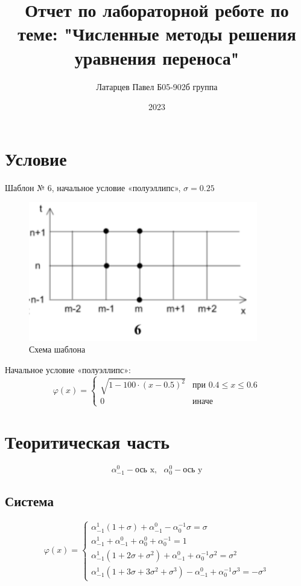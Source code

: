 \documentclass[a4paper, 12pt]{article} %
\title{Отчет по лабораторной реботе по теме: "Численные методы решения уравнения переноса"}
\author{Латарцев Павел Б05-902б группа}
\date{2023}
\begin{document}
\maketitle

\section{Условие} 
Шаблон № 6, начальное условие «полуэллипс», $\sigma = 0.25$

\begin{figure}[h!]
    \centering
    \includegraphics[width=10cm]{shablon.png}
    \caption{Схема шаблона}
    \label{fig:vac}
\end{figure} 

Начальное условие «полуэллипс»:
\begin{equation*}
\varphi(x) = 
 \begin{cases}
   \sqrt{1 - 100 \cdot \left( x - 0.5 \right)^2} &\text{при $0.4 \leqslant x \leqslant 0.6$}\\
   0 &\text{иначе}
\end{cases}
\end{equation*}


\section{Теоритическая часть}
$$\alpha^{0}_{-1} - \text{ось x}, \,\,\,\, \alpha^{0}_{0} - \text{ось y}$$

\subsection{Система}
\begin{equation*}
\varphi(x) = 
 \begin{cases}
 	\alpha^{1}_{-1}\left(1 + \sigma \right) + \alpha^{0}_{-1} - \alpha^{-1}_{0} \sigma = \sigma  \\  
 	\alpha^{1}_{-1} + \alpha^{0}_{-1} + \alpha^{0}_{0} + \alpha^{-1}_{0}  = 1 \\
 	\alpha^{1}_{-1} \left( 1 + 2\sigma + \sigma^2 \right) + \alpha^{0}_{-1} + \alpha^{-1}_{0}\sigma^2 = \sigma^2 \\
 	\alpha^{1}_{-1} \left( 1 + 3\sigma + 3\sigma^2 + \sigma^3 \right) - \alpha^{0}_{-1} + \alpha^{-1}_{0}\sigma^3 = -\sigma^3 
 \end{cases}
\end{equation*}
\end{document}
